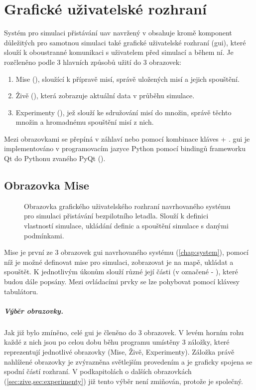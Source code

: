 \chapter{Grafické uživatelské rozhraní} \label{chap:gui}
    Systém pro simulaci přistávání \acrshort{uav} navržený v  obsahuje kromě komponent důležitých pro samotnou simulaci také grafické uživatelské rozhraní (\acrshort{gui}), které slouží k oboustranné komunikaci s uživatelem před simulací a během ní. Je rozčleněno podle 3 hlavních způsobů užití do 3 obrazovek:
    \begin{enumerate}
        \item Mise (), sloužící k přípravě misí, správě uložených misí a jejich spouštění.
        \item Živě (), která zobrazuje aktuální data v průběhu simulace.
        \item Experimenty (), jež slouží ke sdružování misí do množin, správě těchto množin a hromadnému spouštění misí z nich.
    \end{enumerate}
    Mezi obrazovkami se přepíná v záhlaví nebo pomocí kombinace kláves \Ctrl + \Tab. \acrshort{gui} je implementováno v programovacím jazyce Python pomocí bindingů frameworku Qt do Pythonu zvaného PyQt (\cite{pyqt}).
    \section{Obrazovka Mise} \label{sec:mise}
    \begin{figure}
        \centering
        
        \caption[GUI: Obrazovka ]{Obrazovka  grafického uživatelského rozhraní navrhovaného systému pro simulaci přistávání bezpilotního letadla. Slouží k definici vlastností simulace, ukládání definic a spouštění simulace s danými podmínkami.}
        \label{fig:tabMise}
    \end{figure}
    Mise je první ze 3 obrazovek \acrshort{gui} navrhovaného systému (\cref{chap:system}), pomocí níž je možné definovat mise pro simulaci, zobrazovat je na mapě, ukládat a spouštět. K jednotlivým úkonům slouží různé její části (v  označené  - ), které budou dále popsány. Mezi ovládacími prvky se lze pohybovat pomocí klávesy tabulátoru.
    \paragraph{ Výběr obrazovky.}Jak již bylo zmíněno, celé \acrshort{gui} je členěno do 3 obrazovek. V levém horním rohu každé z nich jsou po celou dobu běhu programu umístěny 3 záložky, které reprezentují jednotlivé obrazovky (Mise, Živě, Experimenty). Záložka právě nahlížené obrazovky je zvýrazněna světlejším provedením a je graficky spojena se spodní částí rozhraní. V podkapitolách o dalších obrazovkách (\cref*{sec:zive,sec:experimenty}) již tento výběr není zmiňován, protože je společný.

